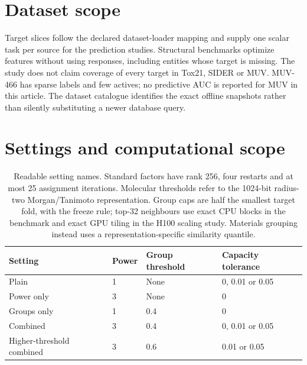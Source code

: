 
\section{Dataset scope}

Target slices follow the declared dataset-loader mapping and supply one scalar
task per source for the prediction studies. Structural benchmarks optimize
features without using responses, including entities whose target is missing.
The study does not claim coverage of every target in Tox21, SIDER or MUV.
MUV-466 has sparse labels and few actives; no predictive AUC is reported for
MUV in this article. The dataset catalogue identifies the exact offline
snapshots rather than silently substituting a newer database query.

\section{Settings and computational scope}

\begin{table}[htbp]\centering
\begin{tabular}{llll}
\toprule
Setting & Power & Group threshold & Capacity tolerance\\
\midrule
Plain & 1 & None & 0, 0.01 or 0.05\\
Power only & 3 & None & 0\\
Groups only & 1 & 0.4 & 0\\
Combined & 3 & 0.4 & 0, 0.01 or 0.05\\
Higher-threshold combined & 3 & 0.6 & 0.01 or 0.05\\
\bottomrule
\end{tabular}
\caption{Readable setting names. Standard factors have rank 256, four restarts
and at most 25 assignment iterations. Molecular thresholds refer to the
1024-bit radius-two Morgan/Tanimoto representation. Group caps are half the
smallest target fold, with the freeze rule; top-32 neighbours use exact CPU
blocks in the benchmark and exact GPU tiling in the H100 scaling study.
Materials grouping instead uses a representation-specific similarity quantile.}
\end{table}

